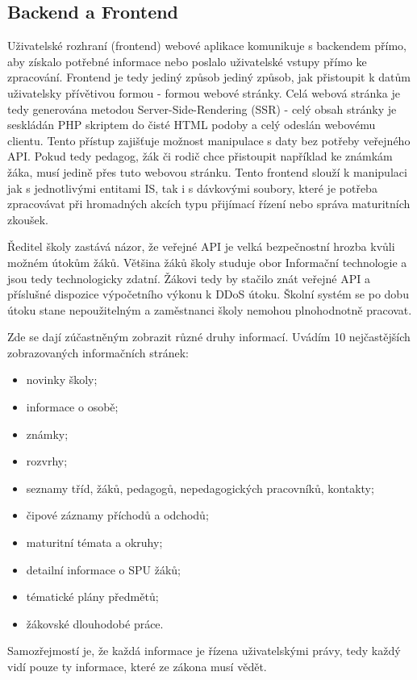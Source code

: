 \documentclass[FM,Proj]{tulthesis}
\begin{document}
\subsection{Backend a Frontend}
\label{section:backend-a-frontend}
Uživatelské rozhraní (frontend) webové aplikace komunikuje s backendem přímo, aby získalo
potřebné informace nebo poslalo uživatelské vstupy přímo ke zpracování. Frontend je
tedy jediný způsob jediný způsob, jak přistoupit k datům uživatelsky přívětivou 
formou - formou webové stránky. Celá webová stránka je tedy generována metodou 
Server-Side-Rendering (SSR) - celý obsah stránky je seskládán
PHP skriptem do čisté HTML podoby a celý odeslán webovému clientu. Tento přístup zajišťuje
možnost manipulace s daty bez potřeby veřejného API. Pokud tedy pedagog, žák či 
rodič chce přistoupit například ke známkám žáka, musí jedině přes tuto webovou stránku.
Tento frontend slouží k manipulaci jak s jednotlivými entitami IS, tak i s dávkovými soubory,
které je potřeba zpracovávat při hromadných akcích typu přijímací řízení nebo správa 
maturitních zkoušek.

Ředitel školy zastává názor, že veřejné API je velká bezpečnostní hrozba kvůli možném útokům
žáků. Většina žáků školy studuje obor Informační technologie a jsou tedy technologicky zdatní.
Žákovi tedy by stačilo znát veřejné API a příslušné dispozice výpočetního výkonu k DDoS útoku.
Školní systém se po dobu útoku stane nepoužitelným a zaměstnanci školy nemohou plnohodnotně
pracovat.

Zde se dají zúčastněným zobrazit různé druhy informací. Uvádím 10 nejčastějších zobrazovaných
informačních stránek:
\begin{itemize}
    \item novinky školy;
    \item informace o osobě;
    \item známky;
    \item rozvrhy;
    \item seznamy tříd, žáků, pedagogů, nepedagogických pracovníků, kontakty;
    \item čipové záznamy příchodů a odchodů;
    \item maturitní témata a okruhy;
    \item detailní informace o SPU žáků;
    \item tématické plány předmětů;
    \item žákovské dlouhodobé práce.


\end{itemize}
Samozřejmostí je, že každá informace je řízena uživatelskými právy, tedy každý vidí pouze ty
informace, které ze zákona musí vědět.
\end{document}
